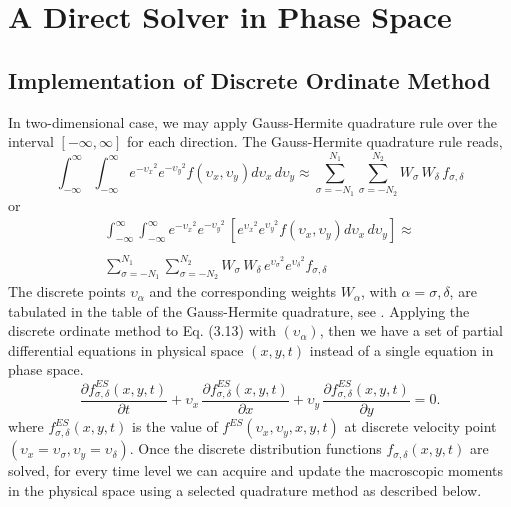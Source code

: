 \documentclass{rsproca}%
\begin{document}
\section{A Direct Solver in Phase Space}
\label{sec:4}
\subsection{Implementation of Discrete Ordinate Method}
In two-dimensional case, we may apply Gauss-Hermite quadrature rule over the interval $[-\infty,\infty]$ for each direction.  The Gauss-Hermite quadrature rule reads,
\begin{equation}
\int^{\infty}_{-\infty}\int^{\infty}_{-\infty}{e^{-{\upsilon_x}^2}e^{-{\upsilon_y}^2}f(\upsilon_x,\upsilon_y)d\upsilon_x\,d\upsilon_y} \approx \sum^{N_1}_{\sigma=-N_1}\sum^{N_2}_{\sigma=-N_2}{W_\sigma\,W_\delta\, f_{\sigma,\delta}}
\end{equation}
or
\begin{eqnarray}
\int^{\infty}_{-\infty}\int^{\infty}_{-\infty}{e^{-{\upsilon_x}^2}e^{-{\upsilon_y}^2}\,[e^{{\upsilon_x}^2}e^{{\upsilon_y}^2}f(\upsilon_x,\upsilon_y) d\upsilon_x\,d\upsilon_y]} \approx \nonumber \\
\nonumber \\
\sum^{N_1}_{\sigma=-N_1}\sum^{N_2}_{\sigma=-N_2}{W_\sigma\,W_\delta\,e^{{\upsilon_\sigma}^2}e^{{\upsilon_\delta}^2}f_{\sigma,\delta}}
\end{eqnarray}
The discrete points $\upsilon_\alpha$ and the corresponding weights $W_\alpha$, with $\alpha=\sigma,\delta$, are tabulated in the table of the Gauss-Hermite quadrature, see \cite{abramowitz+stegun}.
Applying the discrete ordinate method to Eq. (3.13) with $(\upsilon_\alpha)$, then we have a set of partial differential equations in physical space $(x,y,t)$  instead of a single equation in phase space.
\begin{equation}
\frac{\partial f^{ES}_{\sigma,\delta}(x,y,t)}{\partial t} + {\upsilon}_x\,\frac{\partial f^{ES}_{\sigma,\delta} (x,y,t)}{\partial x} + \upsilon_y\,\frac{\partial f^{ES}_{\sigma,\delta} (x,y,t)}{\partial y} = 0.
\label{normalizedes}
\end{equation}
where $f^{ES}_{\sigma,\delta}(x,y,t)$ is the value of $f^{ES}(\upsilon_x,\upsilon_y,x,y,t)$ at discrete velocity point $(\upsilon_x=\upsilon_\sigma,\upsilon_y=\upsilon_\delta)$.
Once the discrete distribution functions $f_{\sigma,\delta}(x,y,t)$ are solved, for every time level we can acquire and update the macroscopic moments in the physical space using a selected quadrature method as described below.
\end{document}
